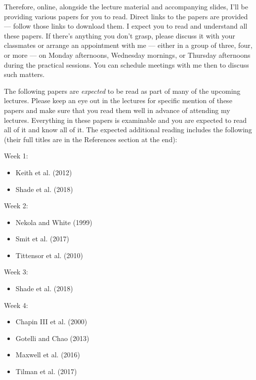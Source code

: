\documentclass[
  11pt,
]{book}
\providecommand{\tightlist}{%
  \setlength{\itemsep}{0pt}\setlength{\parskip}{0pt}}
\begin{document}
Therefore, online, alongside the lecture material and accompanying
slides, I'll be providing various papers for you to read. Direct links
to the papers are provided --- follow those links to download them. I
expect you to read and understand all these papers. If there's anything
you don't grasp, please discuss it with your classmates or arrange an
appointment with me --- either in a group of three, four, or more --- on
Monday afternoons, Wednesday mornings, or Thursday afternoons during the
practical sessions. You can schedule meetings with me then to discuss
such matters.

The following papers are \emph{expected} to be read as part of many of
the upcoming lectures. Please keep an eye out in the lectures for
specific mention of these papers and make sure that you read them well
in advance of attending my lectures. Everything in these papers is
examinable and you are expected to read all of it and know all of it.
The expected additional reading includes the following (their full
titles are in the References section at the end):

Week 1:

\begin{itemize}
\tightlist
\item
  Keith et al. (2012)
\item
  Shade et al. (2018)
\end{itemize}

Week 2:

\begin{itemize}
\tightlist
\item
  Nekola and White (1999)
\item
  Smit et al. (2017)
\item
  Tittensor et al. (2010)
\end{itemize}

Week 3:

\begin{itemize}
\tightlist
\item
  Shade et al. (2018)
\end{itemize}

Week 4:

\begin{itemize}
\tightlist
\item
  Chapin III et al. (2000)
\item
  Gotelli and Chao (2013)
\item
  Maxwell et al. (2016)
\item
  Tilman et al. (2017)
\end{itemize}
\end{document}
